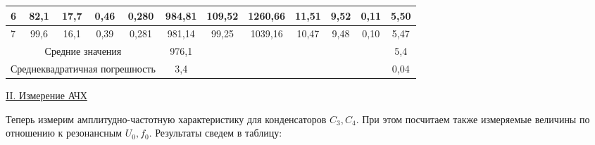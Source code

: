 \documentclass{article}
\begin{document}
\begin{table}[h!]
\begin{tabular}{|lcccc|c|c|c|c|c|c|c|}
\multicolumn{1}{|l|}{6} & \multicolumn{1}{c|}{82,1}   & \multicolumn{1}{c|}{17,7}      & \multicolumn{1}{c|}{0,46} & 0,280                     & 984,81                       & 109,52                          & 1260,66                       & 11,51                  & 9,52                        & 0,11                        & 5,50                           \\ \hline
\multicolumn{1}{|l|}{7} & \multicolumn{1}{c|}{99,6}   & \multicolumn{1}{c|}{16,1}      & \multicolumn{1}{c|}{0,39} & 0,281                     & 981,14                       & 99,25                           & 1039,16                       & 10,47                  & 9,48                        & 0,10                        & 5,47                           \\ \hline
\multicolumn{5}{|c|}{Средние значения}                                                                                                         & 976,1                        & \multicolumn{1}{l|}{}           & \multicolumn{1}{l|}{}         & \multicolumn{1}{l|}{}  & \multicolumn{1}{l|}{}       & \multicolumn{1}{l|}{}       & 5,4                            \\ \hline
\multicolumn{5}{|c|}{Среднеквадратичная погрешность}                                                                                           & 3,4                          & \multicolumn{1}{l|}{}           & \multicolumn{1}{l|}{}         & \multicolumn{1}{l|}{}  & \multicolumn{1}{l|}{}       & \multicolumn{1}{l|}{}       & 0,04                           \\ \hline
\end{tabular}
\end{table}


\begin{center}
    \underline{\large {\RN{2}. Измерение АЧХ}}
\end{center}

Теперь измерим амплитудно-частотную характеристику для конденсаторов $ C_3, C_4 $. При этом посчитаем также измеряемые величины по отношению к резонансным $ U_0, f_0 $. Результаты сведем в таблицу:
\end{document}

